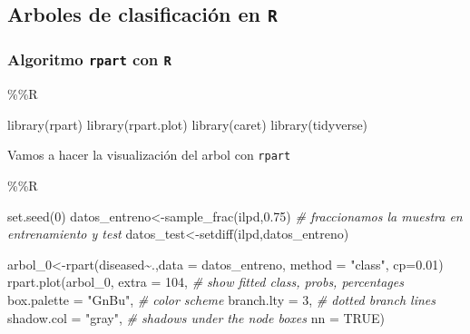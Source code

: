 \documentclass[
  11pt,
  a4paper,
]{article}
\newenvironment{Shaded}{\begin{snugshade}}{\end{snugshade}}
\newcommand{\AttributeTok}[1]{\textcolor[rgb]{0.77,0.63,0.00}{#1}}
\newcommand{\CommentTok}[1]{\textcolor[rgb]{0.56,0.35,0.01}{\textit{#1}}}
\newcommand{\ConstantTok}[1]{\textcolor[rgb]{0.00,0.00,0.00}{#1}}
\newcommand{\DecValTok}[1]{\textcolor[rgb]{0.00,0.00,0.81}{#1}}
\newcommand{\FloatTok}[1]{\textcolor[rgb]{0.00,0.00,0.81}{#1}}
\newcommand{\FunctionTok}[1]{\textcolor[rgb]{0.00,0.00,0.00}{#1}}
\newcommand{\NormalTok}[1]{#1}
\newcommand{\OtherTok}[1]{\textcolor[rgb]{0.56,0.35,0.01}{#1}}
\newcommand{\SpecialCharTok}[1]{\textcolor[rgb]{0.00,0.00,0.00}{#1}}
\newcommand{\StringTok}[1]{\textcolor[rgb]{0.31,0.60,0.02}{#1}}
\begin{document}
\newpage

\hypertarget{arboles-de-clasificaciuxf3n-en-r}{%
\subsection{\texorpdfstring{Arboles de clasificación en \texttt{R}
}{Arboles de clasificación en R }}\label{arboles-de-clasificaciuxf3n-en-r}}

\hypertarget{algoritmo-rpart-con-r}{%
\subsubsection{\texorpdfstring{Algoritmo \texttt{rpart} con \texttt{R}
}{Algoritmo rpart con R }}\label{algoritmo-rpart-con-r}}

\begin{Shaded}
\begin{Highlighting}[]
\SpecialCharTok{\%\%}\NormalTok{R}

\FunctionTok{library}\NormalTok{(rpart)}
\FunctionTok{library}\NormalTok{(rpart.plot)}
\FunctionTok{library}\NormalTok{(caret)}
\FunctionTok{library}\NormalTok{(tidyverse)}
\end{Highlighting}
\end{Shaded}

Vamos a hacer la visualización del arbol con \texttt{rpart}

\begin{Shaded}
\begin{Highlighting}[]
\SpecialCharTok{\%\%}\NormalTok{R}

\FunctionTok{set.seed}\NormalTok{(}\DecValTok{0}\NormalTok{)}
\NormalTok{datos\_entreno}\OtherTok{\textless{}{-}}\FunctionTok{sample\_frac}\NormalTok{(ilpd,}\FloatTok{0.75}\NormalTok{) }\CommentTok{\# fraccionamos la muestra en entrenamiento y test}
\NormalTok{datos\_test}\OtherTok{\textless{}{-}}\FunctionTok{setdiff}\NormalTok{(ilpd,datos\_entreno)}

\NormalTok{arbol\_0}\OtherTok{\textless{}{-}}\FunctionTok{rpart}\NormalTok{(diseased}\SpecialCharTok{\textasciitilde{}}\NormalTok{.,}\AttributeTok{data =}\NormalTok{ datos\_entreno, }\AttributeTok{method =} \StringTok{"class"}\NormalTok{, }\AttributeTok{cp=}\FloatTok{0.01}\NormalTok{)}
\FunctionTok{rpart.plot}\NormalTok{(arbol\_0, }
           \AttributeTok{extra =} \DecValTok{104}\NormalTok{,          }\CommentTok{\# show fitted class, probs, percentages}
           \AttributeTok{box.palette =} \StringTok{"GnBu"}\NormalTok{, }\CommentTok{\# color scheme}
           \AttributeTok{branch.lty =} \DecValTok{3}\NormalTok{,       }\CommentTok{\# dotted branch lines}
           \AttributeTok{shadow.col =} \StringTok{"gray"}\NormalTok{,  }\CommentTok{\# shadows under the node boxes}
           \AttributeTok{nn =} \ConstantTok{TRUE}\NormalTok{)}
\end{Highlighting}
\end{Shaded}
\end{document}
